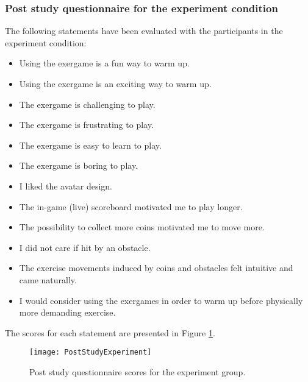 \subsubsection{Post study questionnaire for the experiment condition} 
The following statements have been evaluated with the participants in the experiment condition:
\begin{itemize}
 \item Using the exergame is a fun way to warm up.
 \item  Using the exergame is an exciting way to warm up.
 \item  The exergame is challenging to play.
 \item  The exergame is frustrating to play.
 \item  The exergame is easy to learn to play.
  \item The exergame is boring to play.
  \item I liked the avatar design.
  \item The in-game (live) scoreboard motivated me to play longer.
  \item The possibility to collect more coins motivated me to move more.
 \item  I did not care if hit by an obstacle. 
 \item  The exercise movements induced by coins and obstacles felt intuitive and came naturally. 
 \item I would consider using the exergames in order to warm up before physically more demanding exercise.
\end{itemize}
The scores for each statement are presented in Figure \ref{fig:poststudyexperiment}.\\
\begin{figure}[h]
    \centering
    \texttt{[image: PostStudyExperiment]}
    \caption{Post study questionnaire scores for the experiment group.}
    \label{fig:poststudyexperiment}
\end{figure}\\
